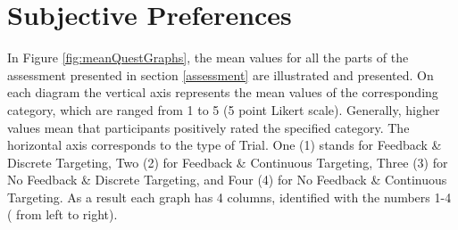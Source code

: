 \section{Subjective Preferences}
\label{resultsSubjectivePreferences}

In Figure \ref{fig:meanQuestGraphs}, the mean values for all the parts of the assessment presented in section \ref{assessment} are illustrated and presented. On each diagram the vertical axis represents the mean values of the corresponding category, which are ranged from 1 to 5 (5 point Likert scale). Generally, higher values mean that participants positively rated the specified category. The horizontal axis corresponds to the type of Trial. One (1) stands for Feedback \& Discrete Targeting, Two (2) for Feedback \& Continuous Targeting, Three (3) for No Feedback \& Discrete Targeting, and Four (4) for No Feedback \& Continuous Targeting. As a result each graph has 4 columns, identified with the numbers 1-4 ( from left to right).


